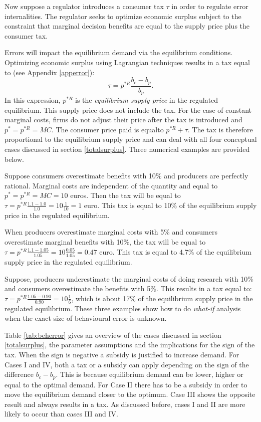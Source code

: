 \documentclass[
]{book}
\begin{document}
Now suppose a regulator introduces a consumer tax \(\tau\) in order to regulate error internalities. The regulator seeks to optimize economic surplus subject to the constraint that marginal decision benefits are equal to the supply price plus the consumer tax.

Errors will impact the equilibrium demand via the equilibrium conditions. Optimizing economic surplus using Lagrangian techniques results in a tax equal to (see Appendix \ref{apperror}):
\begin{equation}
\tau = p^{*R} \frac{b_c - b_p}{b_p}.
\label{eq:opttau}
\end{equation}
In this expression, \(p^{*R}\) is the \emph{equilibrium supply price} in the regulated equilibrium. This supply price does not include the tax. For the case of constant marginal costs, firms do not adjust their price after the tax is introduced and \(p^*=p^{*R}=MC\). The consumer price paid is equalto \(p^{*R} + \tau\). The tax is therefore proportional to the equilibrium supply price and can deal with all four conceptual cases discussed in section \ref{totalsurplus}. Three numerical examples are provided below.

Suppose consumers overestimate benefits with 10\% and producers are perfectly rational. Marginal costs are independent of the quantity and equal to \(p^*=p^{*R}=MC= 10\) euros. Then the tax will be equal to \(\tau=p^{*R} \frac{1.1-1.0}{1.0}=10 \frac{1}{10}=1\) euro. This tax is equal to 10\% of the equilibrium supply price in the regulated equilibrium.

When producers overestimate marginal costs with 5\% and consumers overestimate marginal benefits with 10\%, the tax will be equal to \(\tau=p^{*R} \frac{1.1-1.05}{1.05}=10 \frac{0.05}{1.05}=0.47\) euro. This tax is equal to 4.7\% of the equilibrium supply price in the regulated equilibrium.

Suppose, producers underestimate the marginal costs of doing research with 10\% and consumers overestimate the benefits with 5\%. This results in a tax equal to: \(\tau=p^{*R} \frac{1.05-0.90}{0.90}=10 \frac{1}{6}\), which is about 17\% of the equilibrium supply price in the regulated equilibrium. These three examples show how to do \emph{what-if} analysis when the exact size of behavioural error is unknown.

Table \ref{tab:beherror} gives an overview of the cases discussed in section \ref{totalsurplus}, the parameter assumptions and the implications for the sign of the tax. When the sign is negative a subsidy is justified to increase demand. For Cases I and IV, both a tax or a subsidy can apply depending on the sign of the difference \(b_c-b_p\). This is because equilibrium demand can be lower, higher or equal to the optimal demand. For Case II there has to be a subsidy in order to move the equilibrium demand closer to the optimum. Case III shows the opposite result and always results in a tax. As discussed before, cases I and II are more likely to occur than cases III and IV.
\end{document}

